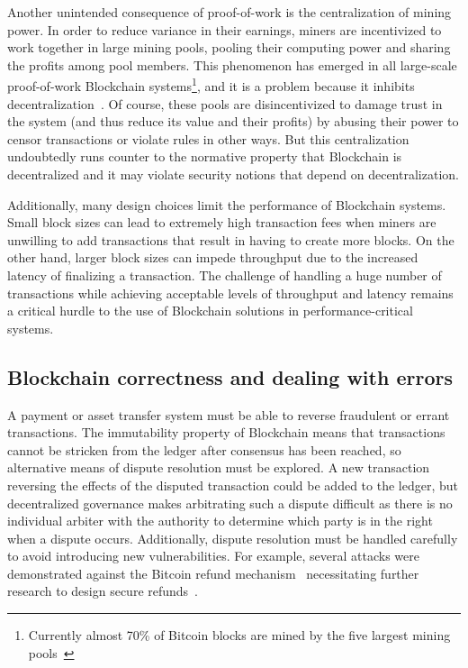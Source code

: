 Another unintended consequence of proof-of-work is the centralization of mining power.  In order to reduce variance in their earnings, miners are incentivized to work together in large mining pools, pooling their computing power and sharing the profits among pool members. This phenomenon has emerged in all large-scale proof-of-work Blockchain systems\footnote{Currently almost 70\% of Bitcoin blocks are mined by the five largest mining pools~\cite{BlockchainInfoPools}}, and it is a problem because it inhibits decentralization~\cite{arxiv:GBERS18}. Of course, these pools are disincentivized to damage trust in the system (and thus reduce its value and their profits) by abusing their power to censor transactions or violate rules in other ways. But this centralization undoubtedly runs counter to the normative property that Blockchain is decentralized and it may violate security notions that depend on decentralization.  

Additionally, many design choices limit the performance of Blockchain systems.  Small block sizes can lead to extremely high transaction fees when miners are unwilling to add transactions that result in having to create more blocks.  On the other hand, larger block sizes can impede  throughput due to the increased latency of finalizing a transaction. %
The challenge of handling a huge number of transactions while achieving acceptable levels of throughput and latency remains a critical hurdle to the use of Blockchain solutions in performance-critical systems.

\subsection{Blockchain correctness and dealing with errors}
\label{subsec:correctness}
A payment or asset transfer system must be able to reverse fraudulent or errant transactions. The immutability property of Blockchain means that transactions cannot be stricken from the ledger after consensus has been reached, so alternative means of dispute resolution must be explored. A new transaction reversing the effects of the disputed transaction could be added to the ledger, but decentralized governance makes arbitrating such a dispute difficult as there is no individual arbiter with the authority to determine which party is in the right when a dispute occurs.  Additionally, dispute resolution must be handled carefully to avoid introducing new vulnerabilities.  For example, several attacks were demonstrated against the Bitcoin refund mechanism~\cite{FC:MccShaHao16} necessitating further research to design secure refunds~\cite{arxiv:AviSafSha18}.

